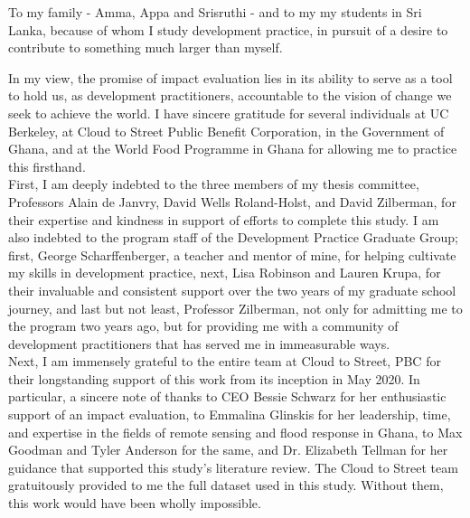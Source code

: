 \documentclass[masters]{ucbthesis}
\begin{document}
\newpage\null\thispagestyle{empty}\newpage
\begin{frontmatter}

\begin{dedication}
\null\vfil
\begin{center}
To my family - Amma, Appa and Srisruthi - and to my my students in Sri Lanka, because of whom I study development practice, in pursuit of a desire to contribute to something much larger than myself.
\end{center}
\vfil\null
\end{dedication}


\tableofcontents
\clearpage
\listoffigures
\clearpage
\listoftables

\begin{acknowledgements}

In my view, the promise of impact evaluation lies in its ability to serve as a tool to hold us, as development practitioners, accountable to the vision of change we seek to achieve the world. I have sincere gratitude for several individuals at UC Berkeley, at Cloud to Street Public Benefit Corporation, in the Government of Ghana, and at the World Food Programme in Ghana for allowing me to practice this firsthand.\\

First, I am deeply indebted to the three members of my thesis committee, Professors Alain de Janvry, David Wells Roland-Holst, and David Zilberman, for their expertise and kindness in support of efforts to complete this study. I am also indebted to the program staff of the Development Practice Graduate Group; first, George Scharffenberger, a teacher and mentor of mine, for helping cultivate my skills in development practice, next, Lisa Robinson and Lauren Krupa, for their invaluable and consistent support over the two years of my graduate school journey, and last but not least, Professor Zilberman, not only for admitting me to the program two years ago, but for providing me with a community of development practitioners that has served me in immeasurable ways.\\

Next, I am immensely grateful to the entire team at Cloud to Street, PBC for their longstanding support of this work from its inception in May 2020. In particular, a sincere note of thanks to CEO Bessie Schwarz for her enthusiastic support of an impact evaluation, to Emmalina Glinskis for her leadership, time, and expertise in the fields of remote sensing and flood response in Ghana, to Max Goodman and Tyler Anderson for the same, and Dr. Elizabeth Tellman for her guidance that supported this study’s literature review. The Cloud to Street team gratuitously provided to me the full dataset used in this study. Without them, this work would have been wholly impossible.\\


\end{acknowledgements}
\end{frontmatter}
\end{document}
